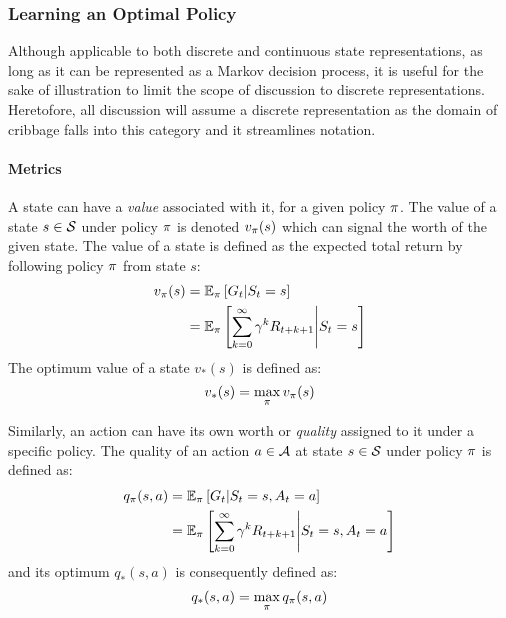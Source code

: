 \subsubsection*{Learning an Optimal Policy}


%
Although applicable to both discrete and continuous state representations,
as long as it can be represented as a Markov decision process,
it is useful for the sake of illustration to limit the scope of discussion to
discrete representations.
%
Heretofore, %
all discussion will assume a discrete representation
as the domain of cribbage falls into this category
and it streamlines notation.

\paragraph*{Metrics}


A state can have a \textit{value} associated with it,
for a given policy $\pi$.
%
The value of a state $s \in \mathcal{S}$ under policy $\pi$ is denoted
$v_\pi(s)$
which can signal the worth of the given state.
%
The value of a state
is defined as the expected total return by following policy $\pi$ from
state $s$:
\begin{align*}
	v_\pi(s) &= \mathbb{E}_\pi\left[G_t \middle| S_t = s\right] \\
		&= \mathbb{E}_\pi \left[
				\sum_{k=0}^{\infty} \gamma^k R_{t+k+1} \middle| S_t = s
			\right]
\end{align*}
%
The optimum value of a state $v_*(s)$ is defined as:
\[ v_*(s) = \max_\pi v_\pi(s) \]

Similarly,
an action can have its own worth or \textit{quality} assigned to it under a
specific policy.
%
The quality of an action $a\in\mathcal{A}$ at state $s\in\mathcal{S}$ under policy
$\pi$ is defined as:
\begin{align*}
	q_\pi(s,a)
		&= \mathbb{E}_\pi\left[ G_t \middle| S_t = s, A_t = a \right]
		\\
		&= \mathbb{E}_\pi\left[
				\sum_{k=0}^{\infty}\gamma^k R_{t+k+1} \middle| S_t = s, A_t = a
			\right]
\end{align*}
and its optimum $q_*(s,a)$ is consequently defined as:
\[
	q_*(s,a) = \max_{\pi}q_\pi(s,a)
\]

